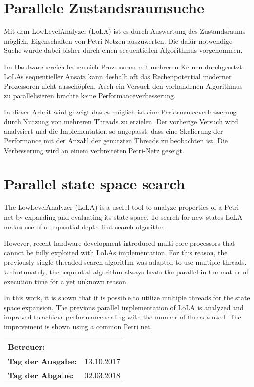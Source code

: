 \section*{Parallele Zustandsraumsuche}
Mit dem LowLevelAnalyzer (LoLA) ist es durch Auswertung des Zustandsraums möglich, Eigenschaften von Petri-Netzen auszuwerten. Die dafür notwendige Suche wurde dabei bisher durch einen sequentiellen Algorithmus vorgenommen.

Im Hardwarebereich haben sich Prozessoren mit mehreren Kernen durchgesetzt. LoLAs sequentieller Ansatz kann deshalb oft das Rechenpotential moderner Prozessoren nicht ausschöpfen. Auch ein Versuch den vorhandenen Algorithmus zu parallelisieren brachte keine Performanceverbesserung.

In dieser Arbeit wird gezeigt das es möglich ist eine Performanceverbesserung durch Nutzung von mehreren Threads zu erzielen. Der vorherige Versuch wird analysiert und die Implementation so angepasst, dass eine Skalierung der Performance mit der Anzahl der genutzten Threads zu beobachten ist. Die Verbesserung wird an einem verbreiteten Petri-Netz gezeigt.

\section*{Parallel state space search}
The LowLevelAnalyzer (LoLA) is a useful tool to analyze properties of a Petri net by expanding and evaluating its state space. To search for new states LoLA makes use of a sequential depth first search algorithm.

However, recent hardware development introduced multi-core processors that cannot be fully exploited with LoLAs implementation. For this reason, the previously single threaded search algorithm was adapted to use multiple threads. Unfortunately, the sequential algorithm always beats the parallel in the matter of execution time for a yet unknown reason.

In this work, it is shown that it is possible to utilize multiple threads for the state space expansion. The previous parallel implementation of LoLA is analyzed and improved to achieve performance scaling with the number of threads used. The improvement is shown using a common Petri net.


\vfill

\begin{tabular}{ll}
	\bfseries Betreuer: & \parbox[t]{10cm}{\betreuer }\vspace{5mm} \\
	\bfseries Tag der Ausgabe: & 13.10.2017 \\
	\bfseries Tag der Abgabe: & 02.03.2018 \\
\end{tabular}

